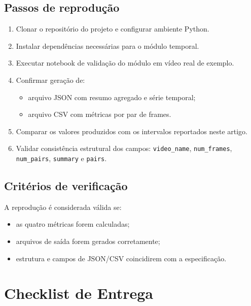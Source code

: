 \documentclass[conference]{IEEEtran}
\begin{document}
\subsection{Passos de reprodução}
\begin{enumerate}
    \item Clonar o repositório do projeto e configurar ambiente Python.
    \item Instalar dependências necessárias para o módulo temporal.
    \item Executar notebook de validação do módulo em vídeo real de exemplo.
    \item Confirmar geração de:
    \begin{itemize}
        \item arquivo JSON com resumo agregado e série temporal;
        \item arquivo CSV com métricas por par de frames.
    \end{itemize}
    \item Comparar os valores produzidos com os intervalos reportados neste artigo.
    \item Validar consistência estrutural dos campos:
    \texttt{video\_name}, \texttt{num\_frames}, \texttt{num\_pairs}, \texttt{summary} e \texttt{pairs}.
\end{enumerate}

\subsection{Critérios de verificação}
A reprodução é considerada válida se:
\begin{itemize}
    \item as quatro métricas forem calculadas;
    \item arquivos de saída forem gerados corretamente;
    \item estrutura e campos de JSON/CSV coincidirem com a especificação.
\end{itemize}

\section{Checklist de Entrega}
\end{document}
